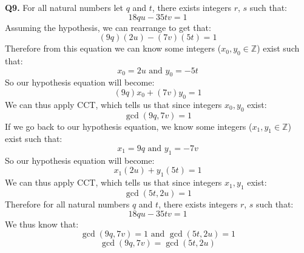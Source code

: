 \documentclass[11pt]{article}
\begin{document}
\parindent=0pt

\textbf{Q9.} For all natural numbers let $q$ and $t$, there exists integers $r$, $s$ such that:
\[ 18qu - 35tv = 1 \]
Assuming the hypothesis, we can rearrange to get that:
\[ (9q)(2u) - (7v)(5t) = 1 \]
Therefore from this equation we can know some integers ($x_0,y_0 \in \mathbb{Z}$) exist such that:
\[ x_0 = 2u \text{ and } y_0 = -5t \]
So our hypothesis equation will become:
\[ (9q)x_0 + (7v)y_0 = 1 \]
We can thus apply CCT, which tells us that since integers $x_0,y_0$ exist:
\[ \gcd(9q,7v) = 1 \]
If we go back to our hypothesis equation, we know some integers ($x_1,y_1 \in \mathbb{Z}$) exist such that:
\[ x_1 = 9q \text{ and } y_1 = -7v \]
So our hypothesis equation will become:
\[ x_1(2u) + y_1(5t) = 1 \]
We can thus apply CCT, which tells us that since integers $x_1,y_1$ exist:
\[ \gcd(5t,2u) = 1 \]
Therefore for all natural numbers $q$ and $t$, there exists integers $r$, $s$ such that:
\[ 18qu - 35tv = 1 \]
We thus know that:
\[ \gcd(9q,7v) = 1 \text{ and } \gcd(5t,2u) = 1  \]
\[ \gcd(9q,7v) = \gcd(5t,2u) \]
\end{document}
